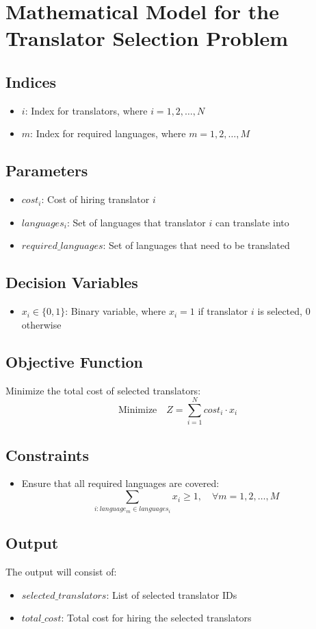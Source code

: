 \documentclass{article}
\begin{document}
\section*{Mathematical Model for the Translator Selection Problem}

\subsection*{Indices}
\begin{itemize}
    \item $i$: Index for translators, where $i = 1, 2, \ldots, N$
    \item $m$: Index for required languages, where $m = 1, 2, \ldots, M$
\end{itemize}

\subsection*{Parameters}
\begin{itemize}
    \item $cost_i$: Cost of hiring translator $i$
    \item $languages_i$: Set of languages that translator $i$ can translate into
    \item $required\_languages$: Set of languages that need to be translated
\end{itemize}

\subsection*{Decision Variables}
\begin{itemize}
    \item $x_i \in \{0, 1\}$: Binary variable, where $x_i = 1$ if translator $i$ is selected, $0$ otherwise
\end{itemize}

\subsection*{Objective Function}
Minimize the total cost of selected translators:
\[
\text{Minimize} \quad Z = \sum_{i=1}^{N} cost_i \cdot x_i
\]

\subsection*{Constraints}
\begin{itemize}
    \item Ensure that all required languages are covered:
    \[
    \sum_{i: language_m \in languages_i} x_i \geq 1, \quad \forall m = 1, 2, \ldots, M
    \]
\end{itemize}

\subsection*{Output}
The output will consist of:
\begin{itemize}
    \item $selected\_translators$: List of selected translator IDs
    \item $total\_cost$: Total cost for hiring the selected translators
\end{itemize}
\end{document}
